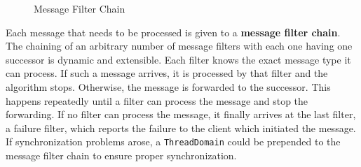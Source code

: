 \begin{figure}[H]
 \centering
 \caption{Message Filter Chain}
 \label{fig:network.discovery.messagefilterchain.concept}
\end{figure}

Each message that needs to be processed is given to a \textbf{message filter chain}. The chaining of an arbitrary number of message filters with each one having one successor is dynamic and extensible. Each filter knows the exact message type it can process. If such a message arrives, it is processed by that filter and the algorithm stops. Otherwise, the message is forwarded to the successor. This happens repeatedly until a filter can process the message and stop the forwarding. If no filter can process the message, it finally arrives at the last filter, a failure filter, which reports the failure to the client which initiated the message. If synchronization problems arose, a \texttt{ThreadDomain} could be prepended to the message filter chain to ensure proper synchronization.

